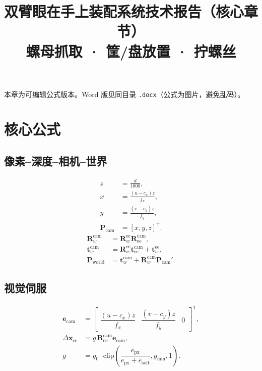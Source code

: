 \documentclass[12pt,a4paper]{article}
\title{双臂眼在手上装配系统技术报告（核心章节）\\\large 螺母抓取 · 筐/盘放置 · 拧螺丝}
\author{}\date{}
\begin{document}
\maketitle
\noindent 本章为可编辑公式版本。Word 版见同目录 \texttt{.docx}（公式为图片，避免乱码）。

\section{核心公式}
\subsection{像素--深度--相机--世界}
\begin{align}
z&=\frac{d}{1000},\\
x&=\frac{(u-c_x)z}{f_x},\\
y&=\frac{(v-c_y)z}{f_y},\\
\mathbf{P}_{\mathrm{cam}}&=[x,y,z]^{\mathsf{T}}.
\end{align}
\begin{align}
\mathbf{R}_{w}^{\mathrm{cam}}&=\mathbf{R}_{w}^{\mathrm{ee}}\mathbf{R}_{\mathrm{ee}}^{\mathrm{cam}},\\
\mathbf{t}_{w}^{\mathrm{cam}}&=\mathbf{R}_{w}^{\mathrm{ee}}\mathbf{t}_{\mathrm{ee}}^{\mathrm{cam}}+\mathbf{t}_{w}^{\mathrm{ee}},\\
\mathbf{P}_{\mathrm{world}}&=\mathbf{t}_{w}^{\mathrm{cam}}+\mathbf{R}_{w}^{\mathrm{cam}}\mathbf{P}_{\mathrm{cam}}'.
\end{align}

\subsection{视觉伺服}
\begin{align}
\mathbf{e}_{\mathrm{cam}}&=\begin{bmatrix}\dfrac{(u-c_x)z}{f_x}&\dfrac{(v-c_y)z}{f_y}&0\end{bmatrix}^{\mathsf{T}},\\
\Delta\mathbf{x}_{\mathrm{ee}}&=g\,\mathbf{R}_{\mathrm{ee}}^{\mathrm{cam}}\mathbf{e}_{\mathrm{cam}},\\
g&=g_0\cdot\mathrm{clip}\!\left(\dfrac{e_{\mathrm{px}}}{e_{\mathrm{px}}+e_{\mathrm{soft}}},g_{\min},1\right).
\end{align}
\end{document}
